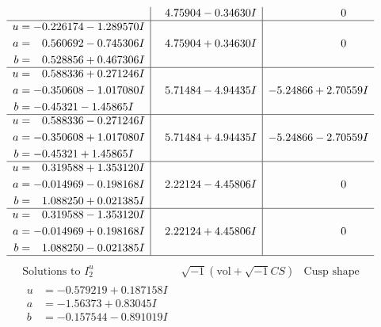 \documentclass[1p]{elsarticle_modified}
\theoremstyle{definition}
\newcommand{\I}{\sqrt{-1}}
\begin{document}
$$\begin{array}{c|c|c}
 & \phantom{-}4.75904 - 0.34630 I & \phantom{-0.000000 } 0 \\ \hline\begin{aligned}
u &= -0.226174 - 1.289570 I \\
a &= \phantom{-}0.560692 - 0.745306 I \\
b &= \phantom{-}0.528856 + 0.467306 I\end{aligned}
 & \phantom{-}4.75904 + 0.34630 I & \phantom{-0.000000 } 0 \\ \hline\begin{aligned}
u &= \phantom{-}0.588336 + 0.271246 I \\
a &= -0.350608 - 1.017080 I \\
b &= -0.45321 - 1.45865 I\end{aligned}
 & \phantom{-}5.71484 - 4.94435 I & -5.24866 + 2.70559 I \\ \hline\begin{aligned}
u &= \phantom{-}0.588336 - 0.271246 I \\
a &= -0.350608 + 1.017080 I \\
b &= -0.45321 + 1.45865 I\end{aligned}
 & \phantom{-}5.71484 + 4.94435 I & -5.24866 - 2.70559 I \\ \hline\begin{aligned}
u &= \phantom{-}0.319588 + 1.353120 I \\
a &= -0.014969 - 0.198168 I \\
b &= \phantom{-}1.088250 + 0.021385 I\end{aligned}
 & \phantom{-}2.22124 - 4.45806 I & \phantom{-0.000000 } 0 \\ \hline\begin{aligned}
u &= \phantom{-}0.319588 - 1.353120 I \\
a &= -0.014969 + 0.198168 I \\
b &= \phantom{-}1.088250 - 0.021385 I\end{aligned}
 & \phantom{-}2.22124 + 4.45806 I & \phantom{-0.000000 } 0\\
 \hline 
 \end{array}$$\newpage$$\begin{array}{c|c|c}  
\text{Solutions to }I^u_{2}& \I (\text{vol} + \sqrt{-1}CS) & \text{Cusp shape}\\
 \hline 
\begin{aligned}
u &= -0.579219 + 0.187158 I \\
a &= -1.56373 + 0.83045 I \\
b &= -0.157544 - 0.891019 I\end{aligned}

\end{array}$$
\end{document}
